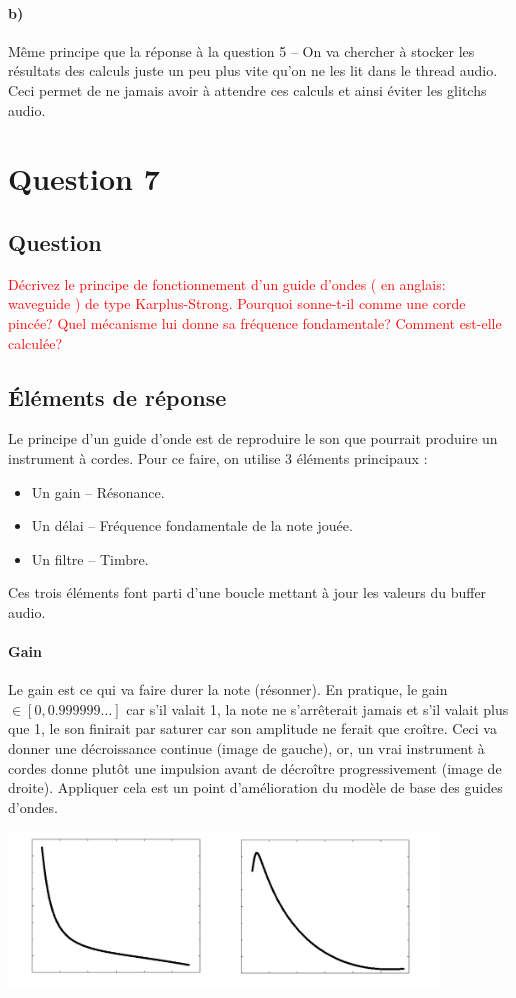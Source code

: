 \documentclass[letterpaper, 12pt]{article}
\newcommand{\alinea}{
\hspace*{0.5cm}}
\newcommand{\red}[1]{
	\textcolor{red}{#1}}
\begin{document}
			\paragraph{b)} Même principe que la réponse à la question 5 -- On va chercher à stocker les résultats des calculs juste un peu
				plus vite qu'on ne les lit dans le thread audio. Ceci permet de ne jamais avoir à attendre ces calculs et ainsi éviter
				les glitchs audio.
	\section{Question 7}
		\subsection{Question}
			\alinea \red{Décrivez le principe de fonctionnement d’un guide d’ondes ( en anglais: waveguide ) de type Karplus-Strong. 
				Pourquoi sonne-t-il comme une corde pincée? Quel mécanisme lui donne sa fréquence fondamentale? Comment est-elle calculée?}
		\subsection{\'Eléments de réponse}
			\alinea Le principe d'un guide d'onde est de reproduire le son que pourrait produire un instrument à cordes. Pour ce faire,
				on utilise 3 éléments principaux : 
				\begin{itemize}
					\setlength\itemsep{0cm}
					\item Un gain -- Résonance.
					\item Un délai -- Fréquence fondamentale de la note jouée.
					\item Un filtre -- Timbre.
				\end{itemize}
				Ces trois éléments font parti d'une boucle mettant à jour les valeurs du buffer audio.
			\paragraph{Gain} Le gain est ce qui va faire durer la note (résonner). En pratique, le gain $\in [0, 0.999999...]$
				car s'il valait 1, la note ne s'arrêterait jamais et s'il valait plus que 1, le son finirait par saturer car son
				amplitude ne ferait que croître. Ceci va donner une décroissance continue (image de gauche),
				or, un vrai instrument à cordes donne plutôt une impulsion avant de décroître progressivement (image de droite).
				Appliquer cela est un point d'amélioration du modèle de base des guides d'ondes.
				\begin{center}
					\includegraphics[width=4.5in]{Images/waveguide}
				\end{center}
\end{document}

